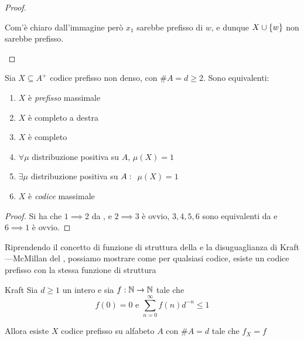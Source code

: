 \begin{proof}
\begin{description}
\begin{figure}[H]
  \end{figure}
  Com'è chiaro dall'immagine però \(x_1\) sarebbe prefisso di \(w\), e dunque \(X\cup\set{w}\) non sarebbe prefisso.
  \end{description}
\end{proof}

\begin{corollary}{}
  Sia \(X \subseteq A^+\) codice prefisso non denso, con \(\# A = d \geq 2\). Sono equivalenti:
  \begin{enumerate}
    \item \(X\) è \textit{prefisso} massimale
    \item \(X\) è completo a destra
    \item \(X\) è completo
    \item \(\forall \mu\) distribuzione positiva su \(A\), \(\mu(X) = 1\)
    \item \(\exists \mu\) distribuzione positiva su \(A:\;\) \(\mu(X) = 1\)
    \item \(X\) è \textit{codice} massimale
  \end{enumerate}
\end{corollary}

\begin{proof}
  Si ha che \(1 \implies 2\) da , e \(2 \implies 3\) è ovvio, \(3,4,5,6\) sono equivalenti da  e \(6 \implies 1\) è ovvio.
\end{proof}

Riprendendo il concetto di funzione di struttura della  e la disuguaglianza di Kraft---McMillan del , possiamo mostrare come per qualsiasi codice, esiste un codice prefisso con la stessa funzione di struttura

\begin{theorem}[namedlabel={thm:kraft}{Kraft}]{Kraft}
  Sia \(d \geq 1\) un intero e sia \(f: \mathbb{N} \to \mathbb{N}\) tale che
  \[f(0) = 0 \text { e }\sum_{n=0}^\infty f(n)d^{-n} \leq 1\]
  
  Allora esiste \(X\) codice prefisso su alfabeto \(A\) con \(\#A = d\) tale che \(f_X = f\)
\end{theorem}

